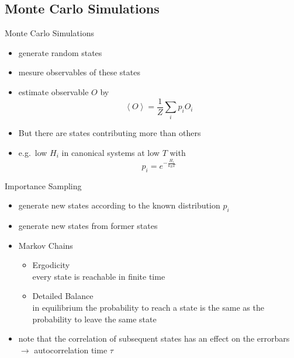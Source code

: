 \documentclass{beamer}
\newcommand{\avg}[1]{\left< #1 \right>}
\begin{document}
    \subsection{Monte Carlo Simulations}
        \begin{frame}{Monte Carlo Simulations}
            \begin{itemize}[<+->]
                \item generate random states
                \item mesure observables of these states
                \item{ estimate observable \(O\) by
                    \begin{equation}
                        \avg{O} = \frac{1}{Z} \sum_i p_i O_i
                    \end{equation}
                }
            \end{itemize}
            \begin{itemize}[<+->]
                \item But there are states contributing more than others
                \item{ e.g.\ low \(H_{i}\) in canonical systems at low \(T\) with
                    \begin{equation}
                        p_{i} = e^{-\frac{H_{i}}{k_{B}T}}
                    \end{equation}
                }
            \end{itemize}
        \end{frame}

        \begin{frame}{Importance Sampling}
            \begin{itemize}[<+->]
                \item generate new states according to the known distribution \(p_{i}\)
                \item generate new states from former states
                \item{ Markov Chains
                    \begin{itemize}
                        \item Ergodicity\\
                                every state is reachable in finite time
                        \item Detailed Balance\\
                                in equilibrium the probability to reach a state is the same as the probability to leave the same state
                    \end{itemize}
                }
                \item note that the correlation of subsequent states has an effect on the errorbars\\
                    \(\to\) autocorrelation time \(\tau\)
            \end{itemize}
        \end{frame}
\end{document}

